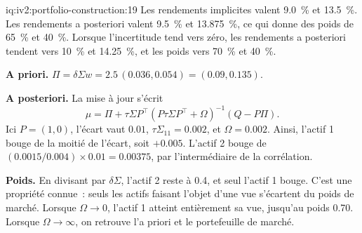 \begin{solution}{iq:iv2:portfolio-construction:19}
Les rendements implicites valent 9.0~\% et 13.5~\%. Les rendements a posteriori valent 9.5~\% et 13.875~\%, ce qui donne des poids de 65~\% et 40~\%. Lorsque l'incertitude tend vers zéro, les rendements a posteriori tendent vers 10~\% et 14.25~\%, et les poids vers 70~\% et 40~\%.

\textbf{A priori.} $\Pi = \delta\Sigma w = 2.5\,(0.036, 0.054) = (0.09, 0.135)$.

\textbf{A posteriori.} La mise à jour s'écrit
\[
\mu = \Pi + \tau\Sigma P^\top(P\tau\Sigma P^\top + \Omega)^{-1}(Q - P\Pi).
\]
Ici $P = (1, 0)$, l'écart vaut $0.01$, $\tau\Sigma_{11} = 0.002$, et $\Omega = 0.002$. Ainsi, l'actif 1 bouge de la moitié de l'écart, soit $+0.005$. L'actif 2 bouge de $(0.0015/0.004) \times 0.01 = 0.00375$, par l'intermédiaire de la corrélation.

\textbf{Poids.} En divisant par $\delta\Sigma$, l'actif 2 reste à 0.4, et seul l'actif 1 bouge. C'est une propriété connue~: seuls les actifs faisant l'objet d'une vue s'écartent du poids de marché. Lorsque $\Omega \to 0$, l'actif 1 atteint entièrement sa vue, jusqu'au poids 0.70. Lorsque $\Omega \to \infty$, on retrouve l'a priori et le portefeuille de marché.

\end{solution}

